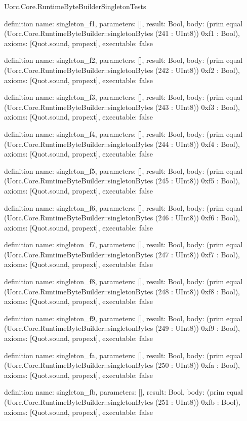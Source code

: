 \begin{lexlean}{Uorc.Core.RuntimeByteBuilderSingletonTests}
\begin{semanticmodule}
definition{
  name: singleton_f1,
  parameters: [],
  result: Bool,
  body: (prim equal (Uorc.Core.RuntimeByteBuilder::singletonBytes (241 : UInt8)) 0xf1 : Bool),
  axioms: [Quot.sound, propext],
  executable: false
}

definition{
  name: singleton_f2,
  parameters: [],
  result: Bool,
  body: (prim equal (Uorc.Core.RuntimeByteBuilder::singletonBytes (242 : UInt8)) 0xf2 : Bool),
  axioms: [Quot.sound, propext],
  executable: false
}

definition{
  name: singleton_f3,
  parameters: [],
  result: Bool,
  body: (prim equal (Uorc.Core.RuntimeByteBuilder::singletonBytes (243 : UInt8)) 0xf3 : Bool),
  axioms: [Quot.sound, propext],
  executable: false
}

definition{
  name: singleton_f4,
  parameters: [],
  result: Bool,
  body: (prim equal (Uorc.Core.RuntimeByteBuilder::singletonBytes (244 : UInt8)) 0xf4 : Bool),
  axioms: [Quot.sound, propext],
  executable: false
}

definition{
  name: singleton_f5,
  parameters: [],
  result: Bool,
  body: (prim equal (Uorc.Core.RuntimeByteBuilder::singletonBytes (245 : UInt8)) 0xf5 : Bool),
  axioms: [Quot.sound, propext],
  executable: false
}

definition{
  name: singleton_f6,
  parameters: [],
  result: Bool,
  body: (prim equal (Uorc.Core.RuntimeByteBuilder::singletonBytes (246 : UInt8)) 0xf6 : Bool),
  axioms: [Quot.sound, propext],
  executable: false
}

definition{
  name: singleton_f7,
  parameters: [],
  result: Bool,
  body: (prim equal (Uorc.Core.RuntimeByteBuilder::singletonBytes (247 : UInt8)) 0xf7 : Bool),
  axioms: [Quot.sound, propext],
  executable: false
}

definition{
  name: singleton_f8,
  parameters: [],
  result: Bool,
  body: (prim equal (Uorc.Core.RuntimeByteBuilder::singletonBytes (248 : UInt8)) 0xf8 : Bool),
  axioms: [Quot.sound, propext],
  executable: false
}

definition{
  name: singleton_f9,
  parameters: [],
  result: Bool,
  body: (prim equal (Uorc.Core.RuntimeByteBuilder::singletonBytes (249 : UInt8)) 0xf9 : Bool),
  axioms: [Quot.sound, propext],
  executable: false
}

definition{
  name: singleton_fa,
  parameters: [],
  result: Bool,
  body: (prim equal (Uorc.Core.RuntimeByteBuilder::singletonBytes (250 : UInt8)) 0xfa : Bool),
  axioms: [Quot.sound, propext],
  executable: false
}

definition{
  name: singleton_fb,
  parameters: [],
  result: Bool,
  body: (prim equal (Uorc.Core.RuntimeByteBuilder::singletonBytes (251 : UInt8)) 0xfb : Bool),
  axioms: [Quot.sound, propext],
  executable: false
}


\end{semanticmodule}
\end{lexlean}
